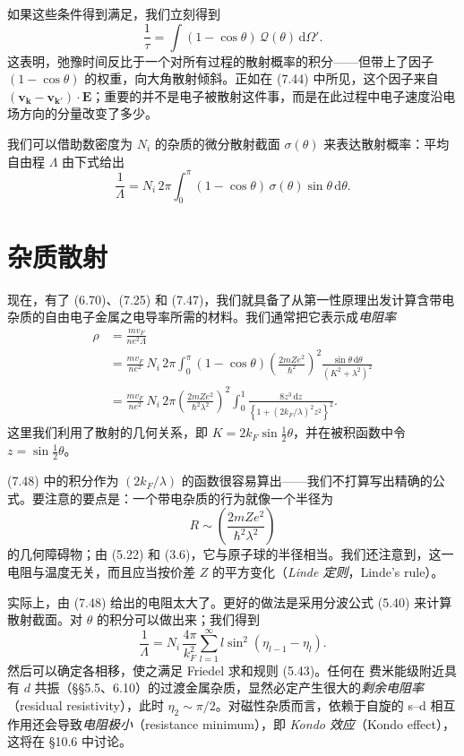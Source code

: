 如果这些条件得到满足，我们立刻得到
\begin{equation*}
\frac{1}{\tau}=\int(1-\cos\theta)\,\mathcal{Q}(\theta)\,\mathrm{d}\Omega'.\tag{7.46}
\end{equation*}
这表明，弛豫时间反比于一个对所有过程的散射概率的积分——但带上了因子 $(1-\cos\theta)$ 的权重，向大角散射倾斜。正如在 (7.44) 中所见，这个因子来自 $(\mathbf{v}_{\mathbf{k}}-\mathbf{v}_{\mathbf{k}'})\cdot\mathbf{E}$；重要的并不是电子被散射这件事，而是在此过程中电子速度沿电场方向的分量改变了多少。

我们可以借助数密度为 $N_{i}$ 的杂质的微分散射截面 $\sigma(\theta)$ 来表达散射概率：平均自由程 $\Lambda$ 由下式给出
\begin{equation*}
\frac{1}{\Lambda}=N_{i}\,2\pi\int_{0}^{\pi}(1-\cos\theta)\,\sigma(\theta)\sin\theta\,\mathrm{d}\theta.\tag{7.47}
\end{equation*}

\section{杂质散射}

现在，有了 (6.70)、(7.25) 和 (7.47)，我们就具备了从第一性原理出发计算含带电杂质的自由电子金属之电导率所需的材料。我们通常把它表示成\emph{电阻率}
\begin{align*}
\rho&=\frac{mv_{F}}{ne^{2}\Lambda}\\
&=\frac{mv_{F}}{ne^{2}}\,N_{i}\,2\pi\int_{0}^{\pi}(1-\cos\theta)\left(\frac{2mZe^{2}}{\hbar^{2}}\right)^{2}\frac{\sin\theta\,\mathrm{d}\theta}{(K^{2}+\lambda^{2})^{2}}\\
&=\frac{mv_{F}}{ne^{2}}\,N_{i}\,2\pi\left(\frac{2mZe^{2}}{\hbar^{2}\lambda^{2}}\right)^{2}\int_{0}^{1}\frac{8z^{3}\,\mathrm{d}z}{\left\{1+(2k_{F}/\lambda)^{2}z^{2}\right\}^{2}}.\tag{7.48}
\end{align*}
这里我们利用了散射的几何关系，即 $K=2k_{F}\sin\frac{1}{2}\theta$，并在被积函数中令 $z=\sin\frac{1}{2}\theta$。

(7.48) 中的积分作为 $(2k_{F}/\lambda)$ 的函数很容易算出——我们不打算写出精确的公式。要注意的要点是：一个带电杂质的行为就像一个半径为
\begin{equation*}
R\sim\left(\frac{2mZe^{2}}{\hbar^{2}\lambda^{2}}\right)\tag{7.49}
\end{equation*}
的几何障碍物；由 (5.22) 和 (3.6)，它与原子球的半径相当。我们还注意到，这一电阻与温度无关，而且应当按价差 $Z$ 的平方变化（\emph{Linde 定则}，Linde's rule）。

实际上，由 (7.48) 给出的电阻太大了。更好的做法是采用分波公式 (5.40) 来计算散射截面。对 $\theta$ 的积分可以做出来；我们得到
\begin{equation*}
\frac{1}{\Lambda}=N_{i}\,\frac{4\pi}{k_{F}^{2}}\sum_{l=1}^{\infty}l\sin^{2}(\eta_{l-1}-\eta_{l}).\tag{7.50}
\end{equation*}
然后可以确定各相移，使之满足 Friedel 求和规则 (5.43)。任何在 费米能级附近具有 $d$ 共振（§§5.5、6.10）的过渡金属杂质，显然必定产生很大的\emph{剩余电阻率}（residual resistivity），此时 $\eta_{2}\sim\pi/2$。对磁性杂质而言，依赖于自旋的 s--d 相互作用还会导致\emph{电阻极小}（resistance minimum），即 \emph{Kondo 效应}（Kondo effect），这将在 §10.6 中讨论。

